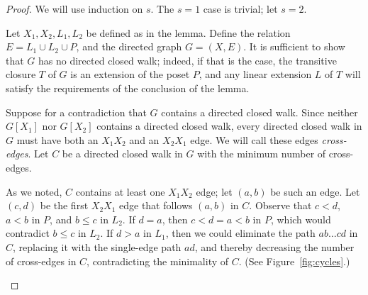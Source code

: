 \begin{proof}
We will use induction on $s$. The $s=1$ case is trivial; let $s=2$.

Let $X_1,X_2,L_1,L_2$ be defined as in the lemma. Define the relation $E=L_1\cup L_2\cup  P$, and the directed graph $G=(X,E)$. It is sufficient to show that $G$ has no directed closed walk; indeed, if that is the case, the transitive closure $T$ of $G$ is an extension of the poset $P$, and any linear extension $L$ of $T$ will satisfy the requirements of the conclusion of the lemma.

Suppose for a contradiction that $G$ contains a directed closed walk.
Since neither $G[X_1]$ nor $G[X_2]$ contains a directed closed walk, every directed closed walk in $G$ must have both an $X_1X_2$ and an $X_2X_1$ edge. We will call these edges \emph{cross-edges}. Let $C$ be a directed closed walk in $G$ with the minimum number of cross-edges.

As we noted, $C$ contains at least one $X_1X_2$ edge; let $(a,b)$ be such an edge. Let $(c,d)$ be the first $X_2X_1$ edge that follows $(a,b)$ in $C$. Observe that $c<d$, $a<b$ in $P$, and $b\leq c$ in $L_2$. If $d=a$, then $c<d=a<b$ in $P$, which would contradict $b\leq c$ in $L_2$. If $d>a$ in $L_1$, then we could eliminate the path $ab\ldots cd$ in $C$, replacing it with the single-edge path $ad$, and thereby decreasing the number of cross-edges in $C$, contradicting the minimality of $C$. (See Figure~\ref{fig:cycles}.)

\begin{figure}
\end{figure}
\end{proof}
